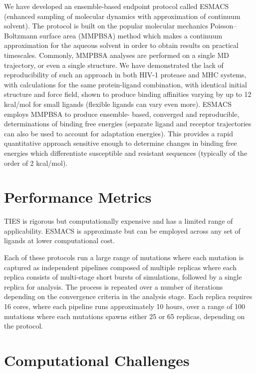 \documentclass[conference]{IEEEtran}
\begin{document}
We have developed an ensemble-based endpoint protocol called ESMACS (enhanced sampling of molecular dynamics with approximation of continuum solvent). The protocol is built on the popular molecular mechanics Poisson–Boltzmann surface area (MMPBSA) \cite{MAssova1999} method which makes a continuum approximation for the aqueous solvent in order to obtain results on practical timescales. Commonly, MMPBSA analyses are performed on a single MD trajectory, or even a single structure. We have demonstrated the lack of reproducibility of such an approach in both HIV-1 protease and MHC systems, with calculations for the same protein-ligand combination, with identical initial structure and force field, shown to produce binding affinities varying by up to 12 kcal/mol for small ligands (flexible ligands can vary even more). \cite{Sadiq2010, Wan2015} ESMACS employs MMPBSA to produce ensemble- based, converged and reproducible, determinations of binding free energies (separate ligand and receptor trajectories can also be used to account for adaptation energies). This provides a rapid quantitative approach sensitive enough to determine changes in binding free energies which differentiate susceptible and resistant sequences (typically of the order of 2 kcal/mol).


\section{Performance Metrics}\label{sec:performance}

TIES is rigorous but computationally expensive and has a limited range of 
applicability. ESMACS is approximate but can be employed across any set of 
ligands at lower computational cost.

Each of these protocols run a large range of mutations where each 
mutation is captured as independent pipelines composed of multiple replicas 
where each replica consists of multi-stage short bursts 
of simulations, followed by a single replica for analysis. The process is 
repeated over a number of iterations depending on the convergence criteria 
in the analysis stage. Each replica requires 16 cores, where each pipeline 
runs approximately 10 hours, over a range of 100 mutations where each mutations 
spawns either 25 or 65 replicas, depending on the protocol.   


\section{Computational Challenges}\label{sec:cc}
\end{document}
